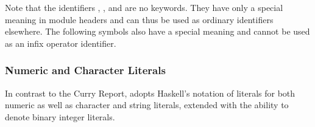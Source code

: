 \begin{grammar}
\end{grammar}

\noindent
Note that the identifiers , ,
 and  are no keywords.
They have only a special meaning in module headers
and can thus be used as ordinary identifiers elsewhere.
The following symbols also have a special meaning and cannot
be used as an infix operator identifier.

\begin{grammar}
\end{grammar}

\subsubsection{Numeric and Character Literals}

In contrast to the Curry Report, \CYS adopts Haskell's notation of literals
for both numeric as well as character and string literals,
extended with the ability to denote binary integer literals.

